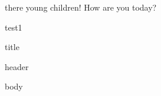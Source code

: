  there young children! How are you today? \blindtext


{\Huge test1}


{\Huge {}}

{\RpgFontTableTitle title

\blindtext}

{\RpgFontTableHeader header

\blindtext}

{\RpgFontTableBody body

\blindtext}





